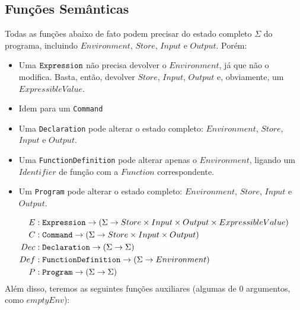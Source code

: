 \documentclass[12pt]{article}
\begin{document}
\subsection{Funções Semânticas}
Todas as funções abaixo de fato podem precisar do estado completo $\Sigma$ do programa, incluindo $Environment$, $Store$, $Input$ e $Output$. Porém:
\begin{itemize}
\item Uma ${\tt Expression}$ não precisa devolver o $Environment$, já que não o modifica. Basta, então, devolver $Store$, $Input$,  $Output$ e, obviamente, um $ExpressibleValue$.
\item Idem para um {\tt Command}
\item Uma {\tt Declaration} pode alterar o estado completo: $Environment$, $Store$, $Input$ e $Output$.
\item Uma {\tt FunctionDefinition} pode alterar apenas o $Environment$, ligando um $Identifier$ de função com a $Function$ correspondente.
\item Um {\tt Program} pode alterar o estado completo: $Environment$, $Store$, $Input$ e $Output$.
\end{itemize}
\begin{align*}
E   &:{\tt Expression} \rightarrow (\Sigma \rightarrow Store \times Input \times Output \times ExpressibleValue) \\
C   &:{\tt Command} \rightarrow (\Sigma \rightarrow Store \times Input \times Output) \\
Dec &:{\tt Declaration} \rightarrow (\Sigma \rightarrow \Sigma) \\
Def &:{\tt FunctionDefinition} \rightarrow (\Sigma \rightarrow Environment) \\
P   &:{\tt Program} \rightarrow (\Sigma \rightarrow \Sigma)
\end{align*}
Além disso, teremos as seguintes funções auxiliares (algumas de $0$ argumentos, como $emptyEnv$):
\end{document}
